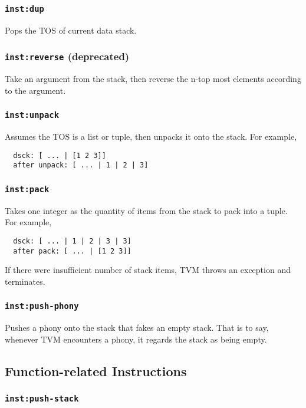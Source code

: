 \documentclass{article}
\newcommand{\inst}[1] {\texttt{inst:#1}}
\begin{document}
\subsubsection{\inst{dup}}

Pops the TOS of current data stack.

\subsubsection{\inst{reverse} (deprecated)}

Take an argument from the stack, then reverse the n-top most elements according to the argument.

\subsubsection{\inst{unpack}}

Assumes the TOS is a list or tuple, then unpacks it onto the stack. For example,
\begin{verbatim}
  dsck: [ ... | [1 2 3]]
  after unpack: [ ... | 1 | 2 | 3]
\end{verbatim}

\subsubsection{\inst{pack}}

Takes one integer as the quantity of items from the stack to pack into a tuple. For example,
\begin{verbatim}
  dsck: [ ... | 1 | 2 | 3 | 3]
  after pack: [ ... | [1 2 3]]
\end{verbatim}

If there were insufficient number of stack items, TVM throws an exception and terminates.

\subsubsection{\inst{push-phony}}

Pushes a phony onto the stack that fakes an empty stack. That is to say, whenever TVM encounters a phony, it regards the stack as being empty.

\subsection{Function-related Instructions}

\subsubsection{\inst{push-stack}}
\end{document}

